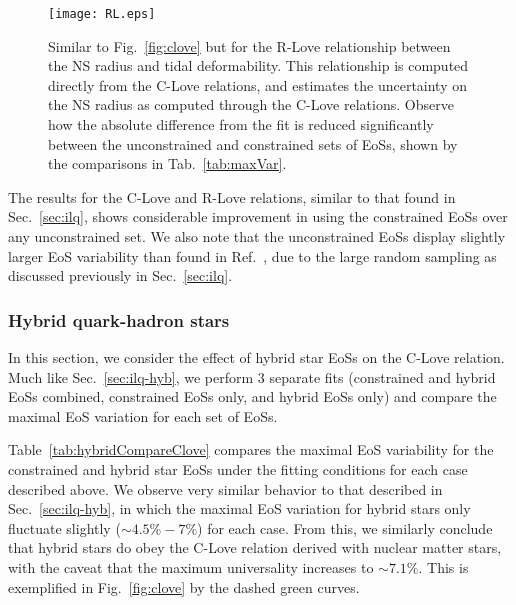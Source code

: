 \documentclass[prd,twocolumn,nofootinbib,superscriptaddress,amsmath,amssymb]{revtex4-1}
\begin{document}
\begin{figure}
\begin{center} 
\texttt{[image: RL.eps]}
\end{center}
\caption{
Similar to Fig.~\ref{fig:clove} but for the R-Love relationship between the NS radius and tidal deformability.
This relationship is computed directly from the C-Love relations, and estimates the uncertainty on the NS radius as computed through the C-Love relations.
Observe how the absolute difference from the fit is reduced significantly between the unconstrained and constrained sets of EoSs, shown by the comparisons in Tab.~\ref{tab:maxVar}.
}
\label{fig:rlove}
\end{figure} 

The results for the C-Love and R-Love relations, similar to that found in Sec.~\ref{sec:ilq}, shows considerable improvement in using the constrained EoSs over any unconstrained set.
We also note that the unconstrained EoSs display slightly larger EoS variability than found in Ref.~\cite{Yagi:binLove}, due to the large random sampling as discussed previously in Sec.~\ref{sec:ilq}.


\subsubsection{Hybrid quark-hadron stars}
\label{sec:clove-hyb}

In this section, we consider the effect of hybrid star EoSs on the C-Love relation.
Much like Sec.~\ref{sec:ilq-hyb}, we perform 3 separate fits (constrained and hybrid EoSs combined, constrained EoSs only, and hybrid EoSs only) and compare the maximal EoS variation for each set of EoSs.

Table~\ref{tab:hybridCompareClove} compares the maximal EoS variability for the constrained and hybrid star EoSs under the fitting conditions for each case described above. 
We observe very similar behavior to that described in Sec.~\ref{sec:ilq-hyb}, in which the maximal EoS variation for hybrid stars only fluctuate slightly ($\sim 4.5\% - 7\%$) for each case.
From this, we similarly conclude that hybrid stars do obey the C-Love relation derived with nuclear matter stars, with the caveat that the maximum universality increases to $\sim 7.1\%$.
This is exemplified in Fig.~\ref{fig:clove} by the dashed green curves.
\end{document}
